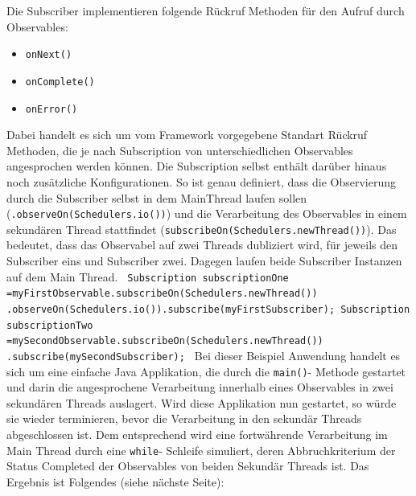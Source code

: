 \documentclass[12pt,oneside,a4paper,bibtotoc,liststotoc]{scrreprt}
\begin{document}
Die Subscriber implementieren folgende Rückruf Methoden für den Aufruf durch Observables:
\begin{itemize}
\item \texttt{onNext()}
\item \texttt{onComplete()}
\item \texttt{onError()}
\end{itemize}
Dabei handelt es sich um vom Framework vorgegebene Standart Rückruf Methoden, die je nach Subscription von unterschiedlichen Observables angesprochen werden können. Die Subscription selbst enthält darüber hinaus noch zusätzliche Konfigurationen. So ist genau definiert, dass die Observierung durch die Subscriber selbst in dem MainThread laufen sollen (\texttt{.observeOn(Schedulers.io())}) und die Verarbeitung des Observables in einem sekundären Thread stattfindet (\texttt{subscribeOn(Schedulers.newThread())}). Das bedeutet, dass das Observabel auf zwei Threads dubliziert wird, für jeweils den Subscriber eins und 
Subscriber zwei. Dagegen laufen beide Subscriber Instanzen auf dem Main Thread.\newline
\texttt{\newline
Subscription subscriptionOne =\newline myFirstObservable.subscribeOn(Schedulers.newThread())
\newline.observeOn(Schedulers.io()).subscribe(myFirstSubscriber);\newline
\newline
Subscription subscriptionTwo =\newline mySecondObservable.subscribeOn(Schedulers.newThread())
\newline.subscribe(mySecondSubscriber);\newline
}\newline
Bei dieser Beispiel Anwendung handelt es sich um eine einfache Java Applikation, die durch die \texttt{main()}- Methode gestartet und darin die angesprochene Verarbeitung innerhalb eines Observables in zwei sekundären Threads auslagert. Wird diese Applikation nun gestartet, so würde sie wieder terminieren, bevor die Verarbeitung in den sekundär Threads abgeschlossen ist. Dem entsprechend wird eine fortwährende Verarbeitung im Main Thread durch eine \texttt{while}- Schleife simuliert, deren Abbruchkriterium der Status Completed der Observables von beiden Sekundär Threads ist. Das Ergebnis ist Folgendes (siehe nächste Seite):\newpage
\end{document}
